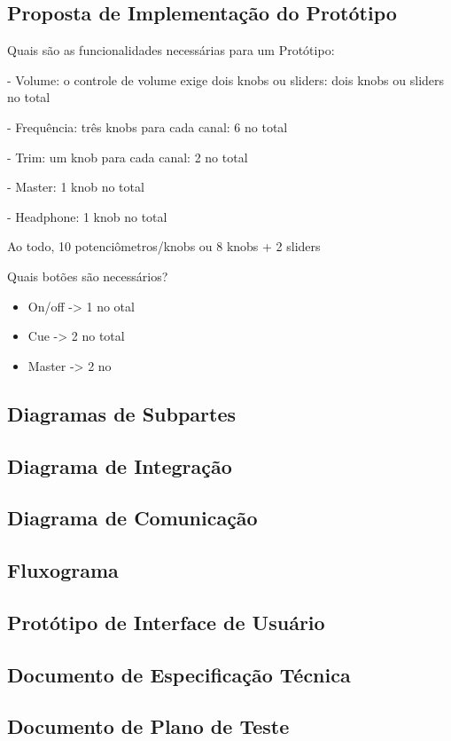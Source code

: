 \subsection{Proposta de Implementação do Protótipo}

Quais são as funcionalidades necessárias para um Protótipo:

- Volume: o controle de volume exige dois knobs ou sliders: dois knobs ou sliders no total

- Frequência: três knobs para cada canal: 6 no total

- Trim: um knob para cada canal: 2 no total

- Master: 1 knob no total

- Headphone: 1 knob no total

Ao todo, 10 potenciômetros/knobs ou 8 knobs + 2 sliders

Quais botões são necessários?

\begin{itemize}
	\item On/off -> 1 no otal
	\item Cue -> 2 no total
	\item Master -> 2 no
\end{itemize}

\subsection{Diagramas de Subpartes}
\subsection{Diagrama de Integração}
\subsection{Diagrama de Comunicação}
\subsection{Fluxograma}
\subsection{Protótipo de Interface de Usuário}
\subsection{Documento de Especificação Técnica}
\subsection{Documento de Plano de Teste}